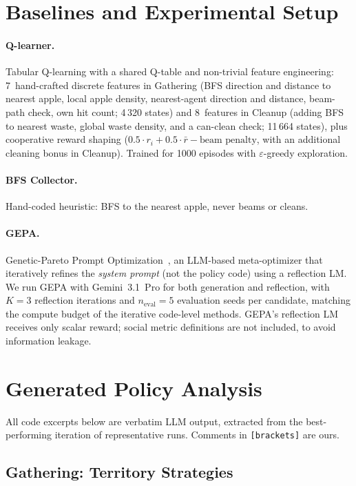 \documentclass{nextgame2026} %
\begin{document}
\section{Baselines and Experimental Setup}
\label{app:setup}

\paragraph{Q-learner.}
Tabular Q-learning with a shared Q-table and non-trivial feature
engineering: 7~hand-crafted discrete features in Gathering
(BFS direction and distance to nearest apple, local apple density,
nearest-agent direction and distance, beam-path check, own hit count;
4\,320 states) and 8~features in Cleanup (adding BFS to nearest waste,
global waste density, and a can-clean check; 11\,664 states), plus
cooperative reward shaping
($0.5 \cdot r_i + 0.5 \cdot \bar{r} - \text{beam penalty}$, with an
additional cleaning bonus in Cleanup).  Trained for 1000 episodes with
$\varepsilon$-greedy exploration.

\paragraph{BFS Collector.}
Hand-coded heuristic: BFS to the nearest apple, never beams or cleans.

\paragraph{GEPA.}
Genetic-Pareto Prompt Optimization~\citep{gepa}, an LLM-based
meta-optimizer that iteratively refines the \emph{system prompt}
(not the policy code) using a reflection LM.  We run GEPA with
Gemini~3.1~Pro for both generation and reflection, with $K\!=\!3$
reflection iterations and $n_{\text{eval}}\!=\!5$ evaluation seeds per
candidate, matching the compute budget of the iterative code-level
methods.  GEPA's reflection LM receives only scalar reward; social
metric definitions are not included, to avoid information leakage.


\section{Generated Policy Analysis}
\label{app:code}

All code excerpts below are verbatim LLM output,
extracted from the best-performing iteration of representative runs.
Comments in \texttt{[brackets]} are ours.

\subsection{Gathering: Territory Strategies}
\label{app:gathering}
\end{document}
